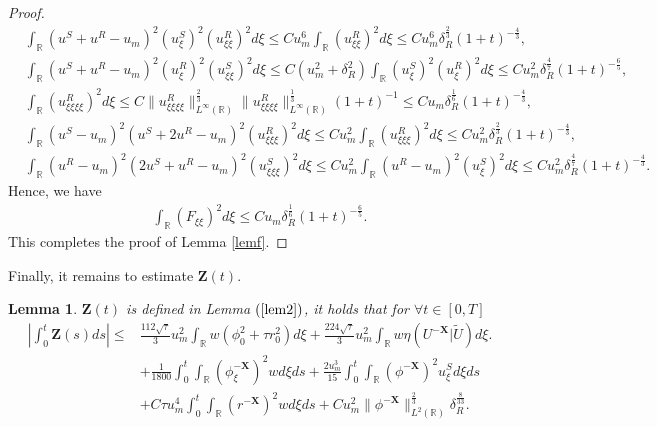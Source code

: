 \documentclass[10pt,reqno]{amsart}
\numberwithin{equation}{section}
\newtheorem{lemma}[theorem]{Lemma}
\begin{document}
\begin{proof}
\begin{align*}
			&\int_{\mathbb{R}}(u^S+u^R-u_m)^2(u_{\xi}^S)^2(u_{\xi\xi}^R)^2d\xi\leq Cu_m^6\int_{\mathbb{R}}(u_{\xi\xi}^R)^2d\xi\leq Cu_m^6\delta_R^{\frac{2}{3}} (1+t)^{-\frac{4}{3}},\\
			&\int_{\mathbb{R}}(u^S+u^R-u_m)^2(u_{\xi}^R)^2(u_{\xi\xi}^S)^2d\xi\leq C(u_m^2+\delta_{R}^2)\int_{\mathbb{R}}(u_{\xi}^S)^2(u_{\xi}^R)^2d\xi\leq Cu_m^2\delta_R^{\frac{4}{7}}(1+t)^{-\frac{6}{5}},\\
			&\int_{\mathbb{R}}(u^R_{\xi\xi\xi\xi})^2d\xi\leq C \|u_{\xi\xi\xi \xi}^{R}\|_{L^\infty(\mathbb{R})}^{\frac{2}{3}} \|u_{\xi \xi\xi\xi}^{R}\|_{L^\infty(\mathbb{R})}^{\frac{1}{3}} (1+t)^{-1} \leq Cu_m\delta_R^{\frac{1}{6}} (1+t)^{-\frac{4}{3}},\\
			&\int_{\mathbb{R}}(u^S-u_m)^2(u^S+2u^R-u_m)^2(u_{\xi\xi\xi}^R)^2d\xi\leq Cu_m^2\int_{\mathbb{R}}(u_{\xi\xi\xi}^R)^2d\xi\leq Cu_m^2\delta_R^{\frac{2}{3}}(1+t)^{-\frac{4}{3}},\\
			&\int_{\mathbb{R}}(u^R-u_m)^2(2u^S+u^R-u_m)^2(u_{\xi\xi\xi}^S)^2d\xi\leq Cu_m^2\int_{\mathbb{R}}(u^R-u_m)^2(u_{\xi}^S)^2d\xi \leq Cu_m^2\delta_R^{\frac{4}{7}}(1+t)^{-\frac{4}{3}}.
		\end{align*}
		Hence, we have 
		\begin{align*}
			\int_{\mathbb{R}}(F_{\xi\xi})^2d\xi\leq Cu_m\delta_R^{\frac{1}{6}}(1+t)^{-\frac{6}{5}}.
		\end{align*}
		This completes the proof of Lemma \ref{lemf}.
	\end{proof}
	Finally, it remains to estimate $\mathbf{Z}(t).$ 
	\begin{lemma}\label{lem7}
		$\mathbf{Z}(t)$ is defined in Lemma $(\ref{lem2})$, it holds that for $\forall t\in \left[0,T\right]$
		\begin{equation}
			\begin{aligned}
				\left|\int_{0}^t\mathbf{Z}(s)ds\right|\leq&\frac{112\sqrt{\tau}}{3}u_m^2\int_{\mathbb{R}}w\left(\phi_{0}^2+\tau r_0^2\right)d\xi+\frac{224\sqrt{\tau}}{3}u_m^2\int_{\mathbb{R}}w\eta(U^{-\mathbf{X}}|\tilde{U})d\xi.\\
				&+\frac{1}{1800}\int_{0}^t\int_{\mathbb{R}} \left(\phi_{\xi}^{-\mathbf{X}}\right)^2wd\xi ds+\frac{2u_m^3}{15}\int_{0}^t\int_{\mathbb{R}}\left(\phi^{-\mathbf{X}}\right)^2u_{\xi}^Sd\xi ds\\
				&+C\tau u_m^4\int_{0}^t\int_{\mathbb{R}}(r^{-\mathbf{X}})^2wd\xi ds+Cu_m^2\| \phi^{-\mathbf{X}} \|_{L^2(\mathbb{R})}^{\frac{2}{3}}\delta_{R}^{\frac{8}{33}}.
			\end{aligned}
		\end{equation}
	\end{lemma}
\end{document}
